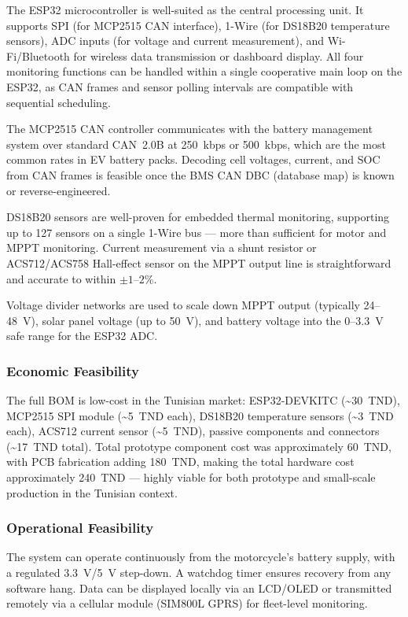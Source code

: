The ESP32 microcontroller is well-suited as the central processing unit. It supports SPI (for MCP2515 CAN interface), 1-Wire (for DS18B20 temperature sensors), ADC inputs (for voltage and current measurement), and Wi-Fi/Bluetooth for wireless data transmission or dashboard display. All four monitoring functions can be handled within a single cooperative main loop on the ESP32, as CAN frames and sensor polling intervals are compatible with sequential scheduling.

The MCP2515 CAN controller communicates with the battery management system over standard CAN~2.0B at 250~kbps or 500~kbps, which are the most common rates in EV battery packs. Decoding cell voltages, current, and SOC from CAN frames is feasible once the BMS CAN DBC (database map) is known or reverse-engineered.

DS18B20 sensors are well-proven for embedded thermal monitoring, supporting up to 127 sensors on a single 1-Wire bus --- more than sufficient for motor and MPPT monitoring. Current measurement via a shunt resistor or ACS712/ACS758 Hall-effect sensor on the MPPT output line is straightforward and accurate to within $\pm 1$--$2$\%.

Voltage divider networks are used to scale down MPPT output (typically 24--48~V), solar panel voltage (up to 50~V), and battery voltage into the 0--3.3~V safe range for the ESP32 ADC.

\subsubsection*{Economic Feasibility}

The full BOM is low-cost in the Tunisian market: ESP32-DEVKITC (\textasciitilde30~TND), MCP2515 SPI module (\textasciitilde5~TND each), DS18B20 temperature sensors (\textasciitilde3~TND each), ACS712 current sensor (\textasciitilde5~TND), passive components and connectors (\textasciitilde17~TND total). Total prototype component cost was approximately 60~TND, with PCB fabrication adding 180~TND, making the total hardware cost approximately 240~TND — highly viable for both prototype and small-scale production in the Tunisian context.

\subsubsection*{Operational Feasibility}

The system can operate continuously from the motorcycle's battery supply, with a regulated 3.3~V/5~V step-down. A watchdog timer ensures recovery from any software hang. Data can be displayed locally via an LCD/OLED or transmitted remotely via a cellular module (SIM800L GPRS) for fleet-level monitoring.

